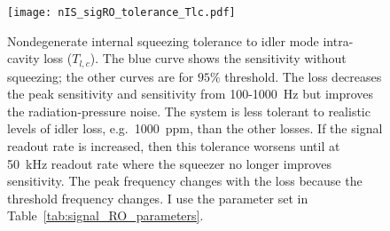 \begin{figure}
    \centering
    \texttt{[image: nIS\_sigRO\_tolerance\_Tlc.pdf]}
    \caption{Nondegenerate internal squeezing tolerance to idler mode intra-cavity loss ($T_{l,c}$). The blue curve shows the sensitivity without squeezing; the other curves are for $95\%$ threshold.
    The loss decreases the peak sensitivity and sensitivity from 100-1000~Hz but improves the radiation-pressure noise. The system is less tolerant to realistic levels of idler loss, e.g.\ 1000~ppm, than the other losses. If the signal readout rate is increased, then this tolerance worsens until at 50~kHz readout rate where the squeezer no longer improves sensitivity. The peak frequency changes with the loss because the threshold frequency changes. I use the parameter set in Table~\ref{tab:signal_RO_parameters}.}
    \label{fig:nIS_sigRO_tolerance_Tlc}
\end{figure}

